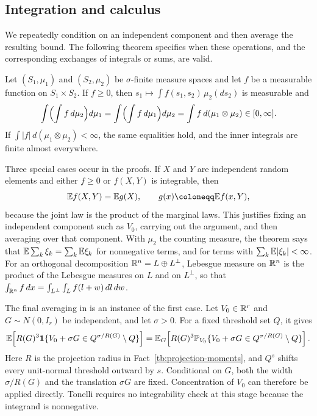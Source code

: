 \subsection{Integration and calculus}\label{tb:sec:calc}

We repeatedly condition on an independent component and then average the
resulting bound. The following theorem specifies when these operations,
and the corresponding exchanges of integrals or sums, are valid.

\begin{fact}\label{tb:fubini}
Let \((S_1,\mu_1)\) and \((S_2,\mu_2)\) be \(\sigma\)-finite measure
spaces and let \(f\) be a measurable function on \(S_1\times S_2\). If
\(f\ge0\), then \(s_1\mapsto\int f(s_1,s_2)\,\mu_2(ds_2)\) is measurable
and
\[
 \int\Bigl(\int f\,d\mu_2\Bigr)d\mu_1
 =\int\Bigl(\int f\,d\mu_1\Bigr)d\mu_2
 =\int f\,d(\mu_1\otimes\mu_2)\in[0,\infty].
\]
If \(\int|f|\,d(\mu_1\otimes\mu_2)<\infty\), the same equalities hold, and
the inner integrals are finite almost everywhere.
\end{fact}

Three special cases occur in the proofs. If \(X\) and \(Y\) are
independent random elements and either \(f\ge0\) or \(f(X,Y)\) is
integrable, then
\[
 \E f(X,Y)=\E g(X),\qquad g(x)\coloneqq \E f(x,Y),
\]
because the joint law is the product of the marginal laws. This justifies
fixing an independent component such as \(V_0\), carrying out the argument,
and then averaging over that component. With
\(\mu_2\) the counting measure, the theorem says that
\(\mathbb E\sum_k\xi_k=\sum_k\mathbb E\xi_k\) for nonnegative terms, and for terms with
\(\sum_k\mathbb E|\xi_k|<\infty\). For an orthogonal decomposition
\(\mathbb R^n=L\oplus L^\perp\), Lebesgue measure on \(\mathbb R^n\) is the product of the
Lebesgue measures on \(L\) and on \(L^\perp\), so that
\(\int_{\mathbb R^n}f\,dx=\int_{L^\perp}\int_Lf(l+w)\,dl\,dw\).

The final averaging in  is an
instance of the first case. Let \(V_0\in\mathbb R^r\) and
\(G\sim N(0,I_r)\) be independent, and let \(\sigma>0\).
For a fixed threshold set \(Q\), it gives
\[
 \mathbb E\!\left[R(G)^3\mathbf 1\{V_0+\sigma G\in
                   Q^{\sigma/R(G)}\setminus Q\}\right]
 =\mathbb E_G\!\left[R(G)^3\mathbb P_{V_0}\{V_0+\sigma G\in
                   Q^{\sigma/R(G)}\setminus Q\}\right].
\]
Here \(R\) is the projection radius in
Fact~\ref{tb:projection-moments}, and \(Q^s\) shifts every
unit-normal threshold outward by \(s\). Conditional on \(G\), both
the width \(\sigma/R(G)\) and the translation \(\sigma G\) are fixed.
Concentration of \(V_0\) can therefore be applied directly. Tonelli
requires no integrability check at this stage because the integrand
is nonnegative.

